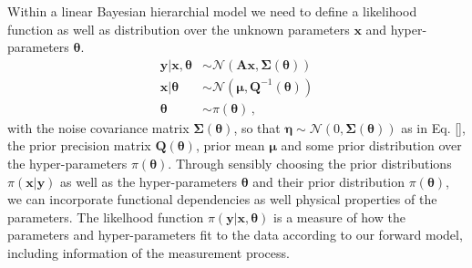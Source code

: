 \begin{figure}[ht!]
	\centering

\end{figure}


Within a linear Bayesian hierarchial model we need to define a likelihood function as well as distribution over the unknown parameters $\bm{x}$ and hyper-parameters $\bm{\theta}$.
\begin{subequations}
	\begin{align}
		\bm{y}|\bm{x}, \bm{\theta}&\sim \mathcal{N}(\bm{A} \bm{x}, \bm{\Sigma}(\bm{\theta})) \label{eq:likelihood}  \\
		\bm{x}| \bm{\theta} & \sim  \mathcal{N}( \bm{\mu}, \bm{Q}^{-1}(\bm{\theta})  ) \label{eq:xPrior} \\
		\bm{\theta} &\sim  \pi(\bm{\theta}) \label{eq:gammaPrior}\, ,
	\end{align}
	\label{eq:BayMode}
\end{subequations}
with the noise covariance matrix $\bm{\Sigma}(\bm{\theta})$, so that $\bm{\eta}  \sim \mathcal{N}(0, \bm{\Sigma}(\bm{\theta})) $ as in Eq. \ref{}, the prior precision matrix $\bm{Q}(\bm{\theta})$, prior mean $\bm{\mu}$
and some prior distribution over the hyper-parameters $\pi(\bm{\theta})$.
Through sensibly choosing the prior distributions  $\pi(\bm{x}|\bm{y})$ as well as the hyper-parameters $\bm{\theta}$ and their prior distribution  $\pi(\bm{\theta})$, we can incorporate functional dependencies as well physical properties of the parameters.
The likelhood function $\pi(\bm{y}|\bm{x}, \bm{\theta})$ is a measure of how the parameters and hyper-parameters fit to the data according to our forward model, including information of the measurement process.

